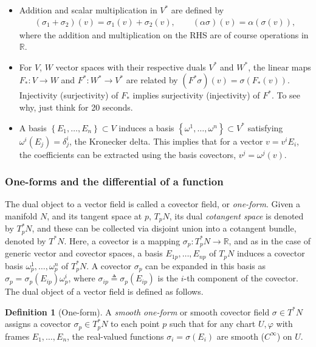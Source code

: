 \documentclass[psamsfonts]{amsart}
\theoremstyle{definition}
\newtheorem{defn}[thm]{Definition}
\theoremstyle{remark}
\newcommand*\R{\mathds{R}}
\numberwithin{equation}{section}
\begin{document}
\begin{itemize}
    \item Addition and scalar multiplication in $V^*$ are defined by
\begin{equation*}
\begin{aligned}
\left( \sigma_1 + \sigma_2 \right)(v) = \sigma_1(v)+\sigma_2(v), \qquad (\alpha \sigma) (v) = \alpha \left(\sigma(v)\right), 
\end{aligned}
\end{equation*}
where the addition and multiplication on the RHS are of course operations in $\R$. 
    \item For $V$, $W$ vector spaces with their respective duals $V^*$ and $W^*$, the linear maps $F_*:V\rightarrow W$ and $F^*:W^*\rightarrow V^*$ are related by $(F^*\sigma)(v) = \sigma (F_*(v))$. Injectivity (surjectivity) of $F_*$ implies surjectivity (injectivity) of $F^*$. To see why, just think for 20 seconds. 
    \item A basis $\left\{E_1, \dots, E_n\right\} \subset V$ induces a basis $\left\{\omega^1, \dots, \omega^n\right\} \subset V^*$ satisfying $\omega^i(E_j) = \delta^i_j$, the Kronecker delta. This implies that for a vector $v = v^i E_i$, the coefficients can be extracted using the basis covectors, $v^j = \omega^j(v)$. 
\end{itemize}

\subsubsection{One-forms and the differential of a function}

The dual object to a vector field is called a covector field, or \textit{one-form}. Given a manifold $N$, and its tangent space at $p$, $T_pN $, its dual \textit{cotangent space} is denoted by $T^*_pN$, and these can be collected via disjoint union into a cotangent bundle, denoted by $T^*N$. Here, a covector is a mapping $\sigma_p : T^*_pN\rightarrow \R$, and as in the case of generic vector and covector spaces, a basis $E_{1p}, \dots, E_{np}$ of $T_pN$ induces a covector basis $\omega^1_p, \dots, \omega^n_p$ of $T^*_pN$. A covector $\sigma_p$ can be expanded in this basis as $\sigma_p = \sigma_p(E_{ip})\omega^i_p$, where $\sigma_{ip}\triangleq\sigma_p(E_{ip})$ is the $i$-th component of the covector. The dual object of a vector field is defined as follows. 

\begin{defn}[One-form]\label{def:oneform}
A \textit{smooth one-form} or smooth covector field $\sigma\in T^*N$ assigns a covector $\sigma_p\in T_p^*N$ to each point $p$ such that for any chart $U, \varphi$ with frames $E_1, \dots, E_n$, the real-valued functions $\sigma_{i} = \sigma(E_i)$ are smooth ($C^{\infty}$) on $U$. 
\end{defn}
\end{document}
